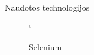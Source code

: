 \begin{frame}[c]{Naudotos technologijos}
\begin{minipage}{0.32\textwidth}
\begin{figure}
            `\caption{Selenium \cite{selenium}}
        \end{figure}
    \end{minipage}
\end{frame}